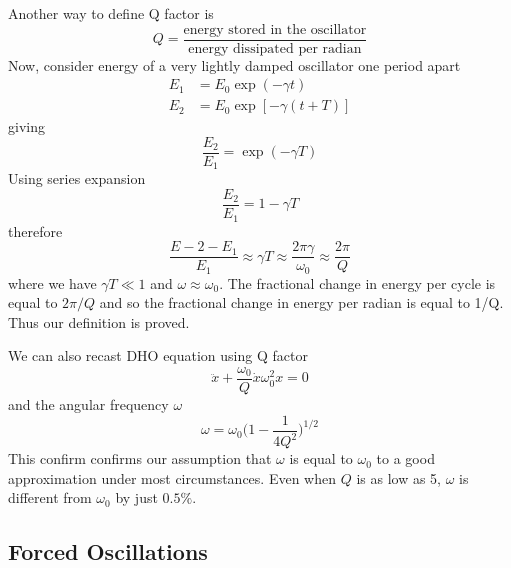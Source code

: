 \documentclass[../../../main.tex]{subfiles}
\begin{document}
Another way to define Q factor is 
\begin{equation*}
    Q=\frac{\text{energy stored in the oscillator}}{\text{energy dissipated per radian}}
\end{equation*}
Now, consider energy of a very lightly damped oscillator one period apart 
\begin{align*}
    E_1&=E_0\exp(-\gamma t) \\
    E_2&=E_0\exp[-\gamma (t+T)]
\end{align*}
giving
\begin{equation*}
    \frac{E_2}{E_1}=\exp(-\gamma T)
\end{equation*}
Using series expansion
\begin{equation*}
    \frac{E_2}{E_1}=1-\gamma T
\end{equation*}
therefore
\begin{equation*}
    \frac{E-2-E_1}{E_1}\approx\gamma T\approx\frac{2\pi\gamma}{\omega_0}\approx\frac{2\pi}{Q}
\end{equation*}
where we have $\gamma T\ll 1$ and $\omega\approx\omega_0$. The fractional change in energy per cycle is equal to $2\pi/Q$ and so the fractional change in energy per radian is equal to 1/Q. Thus our definition is proved.

We can also recast DHO equation using Q factor
\begin{equation*}
    \ddot{x}+\frac{\omega_0}{Q}\dot{x}\omega_0^2x=0
\end{equation*}
and the angular frequency $\omega$
\begin{equation*}
    \omega =\omega_0\biggl(1-\frac{1}{4Q^2}\biggr)^{1/2}
\end{equation*}
This confirm confirms our assumption that $\omega$ is equal to $\omega_0$ to a good approximation under most circumstances. Even when $Q$ is as low as 5, $\omega$ is different from $\omega_0$ by just $0.5\%$.

\subsection{Forced Oscillations}
\end{document}
